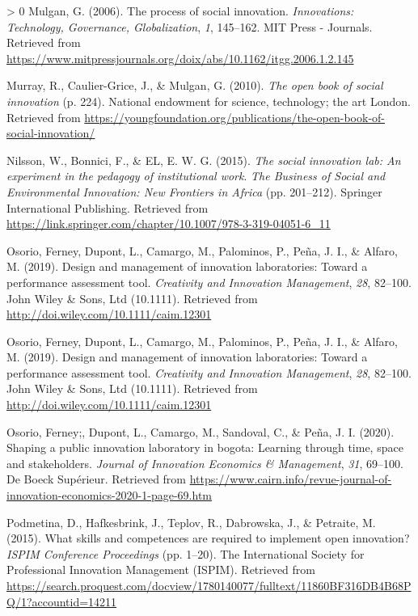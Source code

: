 \documentclass[]{elsarticle} %
\newlength{\cslhangindent}
\newenvironment{CSLReferences}[3] %
 {%
  \setlength{\parindent}{0pt}
  \ifodd #1 \everypar{\setlength{\hangindent}{\cslhangindent}}\ignorespaces\fi
  \ifnum #2 > 0
  \setlength{\parskip}{#2\baselineskip}
  \fi
 }%
 {}
\begin{document}
\begin{CSLReferences}{1}{0}
\leavevmode\hypertarget{ref-Mulgan2006}{}%
Mulgan, G. (2006). The process of social innovation. \emph{Innovations:
Technology, Governance, Globalization}, \emph{1}, 145--162. MIT Press -
Journals. Retrieved from
\url{https://www.mitpressjournals.org/doix/abs/10.1162/itgg.2006.1.2.145}

\leavevmode\hypertarget{ref-Murray2010}{}%
Murray, R., Caulier-Grice, J., \& Mulgan, G. (2010). \emph{The open book
of social innovation} (p. 224). National endowment for science,
technology; the art London. Retrieved from
\url{https://youngfoundation.org/publications/the-open-book-of-social-innovation/}

\leavevmode\hypertarget{ref-Nilsson2015}{}%
Nilsson, W., Bonnici, F., \& EL, E. W. G. (2015). \emph{The social
innovation lab: An experiment in the pedagogy of institutional work}.
\emph{The Business of Social and Environmental Innovation: New Frontiers
in Africa} (pp. 201--212). Springer International Publishing. Retrieved
from
\url{https://link.springer.com/chapter/10.1007/978-3-319-04051-6_11}

\leavevmode\hypertarget{ref-Osorio2019}{}%
Osorio, Ferney, Dupont, L., Camargo, M., Palominos, P., Peña, J. I., \&
Alfaro, M. (2019). Design and management of innovation laboratories:
Toward a performance assessment tool. \emph{Creativity and Innovation
Management}, \emph{28}, 82--100. John Wiley \& Sons, Ltd (10.1111).
Retrieved from \url{http://doi.wiley.com/10.1111/caim.12301}

\leavevmode\hypertarget{ref-Osorio2019}{}%
Osorio, Ferney, Dupont, L., Camargo, M., Palominos, P., Peña, J. I., \&
Alfaro, M. (2019). Design and management of innovation laboratories:
Toward a performance assessment tool. \emph{Creativity and Innovation
Management}, \emph{28}, 82--100. John Wiley \& Sons, Ltd (10.1111).
Retrieved from \url{http://doi.wiley.com/10.1111/caim.12301}

\leavevmode\hypertarget{ref-Osorio2020}{}%
Osorio, Ferney;, Dupont, L., Camargo, M., Sandoval, C., \& Peña, J. I.
(2020). Shaping a public innovation laboratory in bogota: Learning
through time, space and stakeholders. \emph{Journal of Innovation
Economics \& Management}, \emph{31}, 69--100. De Boeck Supérieur.
Retrieved from
\url{https://www.cairn.info/revue-journal-of-innovation-economics-2020-1-page-69.htm}

\leavevmode\hypertarget{ref-Podmetina2015}{}%
Podmetina, D., Hafkesbrink, J., Teplov, R., Dabrowska, J., \& Petraite,
M. (2015). What skills and competences are required to implement open
innovation? \emph{ISPIM Conference Proceedings} (pp. 1--20). The
International Society for Professional Innovation Management (ISPIM).
Retrieved from
\url{https://search.proquest.com/docview/1780140077/fulltext/11860BF316DB4B68PQ/1?accountid=14211}


\end{CSLReferences}
\end{document}
